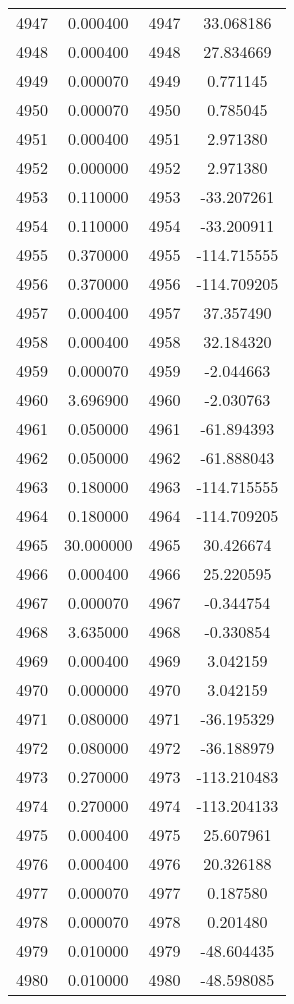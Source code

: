 \documentclass[12pt]{article}
\begin{document}
\begin{longtable}{@{}cccc@{}}
4947 & 0.000400 & 4947 & 33.068186 \\
4948 & 0.000400 & 4948 & 27.834669 \\
4949 & 0.000070 & 4949 & 0.771145 \\
4950 & 0.000070 & 4950 & 0.785045 \\
4951 & 0.000400 & 4951 & 2.971380 \\
4952 & 0.000000 & 4952 & 2.971380 \\
4953 & 0.110000 & 4953 & -33.207261 \\
4954 & 0.110000 & 4954 & -33.200911 \\
4955 & 0.370000 & 4955 & -114.715555 \\
4956 & 0.370000 & 4956 & -114.709205 \\
4957 & 0.000400 & 4957 & 37.357490 \\
4958 & 0.000400 & 4958 & 32.184320 \\
4959 & 0.000070 & 4959 & -2.044663 \\
4960 & 3.696900 & 4960 & -2.030763 \\
4961 & 0.050000 & 4961 & -61.894393 \\
4962 & 0.050000 & 4962 & -61.888043 \\
4963 & 0.180000 & 4963 & -114.715555 \\
4964 & 0.180000 & 4964 & -114.709205 \\
4965 & 30.000000 & 4965 & 30.426674 \\
4966 & 0.000400 & 4966 & 25.220595 \\
4967 & 0.000070 & 4967 & -0.344754 \\
4968 & 3.635000 & 4968 & -0.330854 \\
4969 & 0.000400 & 4969 & 3.042159 \\
4970 & 0.000000 & 4970 & 3.042159 \\
4971 & 0.080000 & 4971 & -36.195329 \\
4972 & 0.080000 & 4972 & -36.188979 \\
4973 & 0.270000 & 4973 & -113.210483 \\
4974 & 0.270000 & 4974 & -113.204133 \\
4975 & 0.000400 & 4975 & 25.607961 \\
4976 & 0.000400 & 4976 & 20.326188 \\
4977 & 0.000070 & 4977 & 0.187580 \\
4978 & 0.000070 & 4978 & 0.201480 \\
4979 & 0.010000 & 4979 & -48.604435 \\
4980 & 0.010000 & 4980 & -48.598085 \\

\end{longtable}
\end{document}
